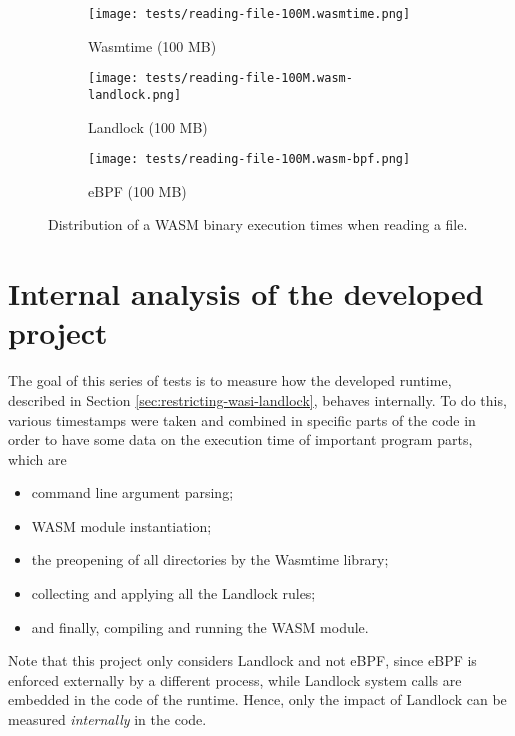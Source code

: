 \begin{figure}[ht!]
  \begin{subfigure}[b]{0.32\textwidth}
    \centering
    \texttt{[image: tests/reading-file-100M.wasmtime.png]}
    \caption{Wasmtime (100 MB)}
  \end{subfigure}
  \begin{subfigure}[b]{0.32\textwidth}
    \centering
    \texttt{[image: tests/reading-file-100M.wasm-landlock.png]}
    \caption{Landlock (100 MB)}
  \end{subfigure}
  \begin{subfigure}[b]{0.32\textwidth}
    \centering
    \texttt{[image: tests/reading-file-100M.wasm-bpf.png]}
    \caption{eBPF (100 MB)}
  \end{subfigure}

  \caption{Distribution of a WASM binary execution times when reading a file.}
  \label{fig:distribution-reading-wasm}
\end{figure}

\clearpage

\section{Internal analysis of the developed project}
\label{sec:performance-internal-analysis}

The goal of this series of tests is to measure how the developed runtime,
described in Section \ref{sec:restricting-wasi-landlock}, behaves internally.
To do this, various timestamps were taken and combined in specific parts of the
code in order to have some data on the execution time of important program parts,
which are
\begin{itemize}
  \item command line argument parsing;
  \item WASM module instantiation;
  \item the preopening of all directories by the Wasmtime library;
  \item collecting and applying all the Landlock rules;
  \item and finally, compiling and running the WASM module.
\end{itemize}

Note that this project only considers Landlock and not eBPF, since eBPF is enforced externally
by a different process, while Landlock system calls are embedded in the code of the runtime.
Hence, only the impact of Landlock can be measured \textit{internally} in the code.

